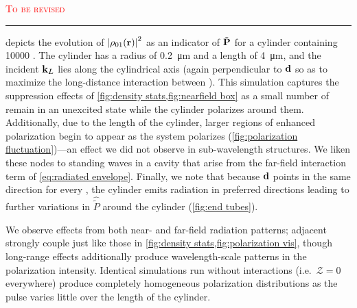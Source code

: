 \begin{center}
  \textcolor{red}{\textsc{To be revised} \\ \rule{5cm}{1.4pt}}
\end{center}

 depicts the evolution of $\abs{\rho_{01}(\vb{r})}^2$ as an indicator of $\tilde{\vb{P}}$ for a cylinder containing \num{10000} \qds{}.
The cylinder has a radius of \SI{0.2}{\micro\meter} and a length of \SI{4}{\micro\meter}, and the incident $\vb{k}_L$ lies along the cylindrical axis (again perpendicular to $\vb{d}$ so as to maximize the long-distance interaction between \qds{}).
This simulation captures the suppression effects of \cref{fig:density stats,fig:nearfield box} as a small number of \qds{} remain in an unexcited state while the cylinder polarizes around them.
Additionally, due to the length of the cylinder, larger regions of enhanced polarization begin to appear as the system polarizes (\cref{fig:polarization fluctuation})---an effect we did not observe in sub-wavelength structures.
We liken these nodes to standing waves in a cavity that arise from the far-field interaction term of \cref{eq:radiated envelope}.
Finally, we note that because $\vb{d}$ points in the same direction for every \qd{}, the cylinder emits radiation in preferred directions leading to further variations in $\hat{\tilde{P}}$ around the cylinder (\cref{fig:end tubes}).


We observe effects from both near- and far-field radiation patterns; adjacent \qds{} strongly couple just like those in \cref{fig:density stats,fig:polarization vis}, though long-range effects additionally produce wavelength-scale patterns in the polarization intensity.
Identical simulations run without interactions (i.e.~$\mathcal{Z} = 0$ everywhere) produce completely homogeneous polarization distributions as the pulse varies little over the length of the cylinder.

